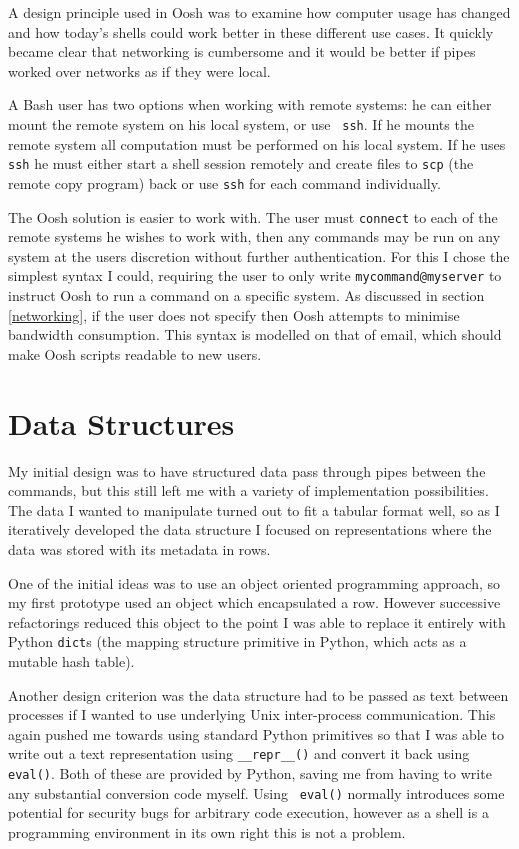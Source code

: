 \documentclass[12pt,twoside,notitlepage]{report}
\begin{document}
A design principle used in Oosh was to examine how computer usage has
changed and how today's shells could work better in these different
use cases. It quickly became clear that networking is cumbersome and
it would be better if pipes worked over networks as if they were
local.

A Bash user has two options when working with remote systems: he can
either mount the remote system on his local system, or use {\tt
  ssh}. If he mounts the remote system all computation must be
performed on his local system. If he uses {\tt ssh} he must either
start a shell session remotely and create files to {\tt scp} (the
remote copy program) back or use {\tt ssh} for each command
individually.

The Oosh solution is easier to work with. The user must {\tt connect}
to each of the remote systems he wishes to work with, then any
commands may be run on any system at the users discretion without
further authentication. For this I chose the simplest syntax I could,
requiring the user to only write {\tt mycommand@myserver} to instruct
Oosh to run a command on a specific system. As discussed in section
\ref{networking}, if the user does not specify then Oosh attempts to
minimise bandwidth consumption. This syntax is modelled on that of
email, which should make Oosh scripts readable to new users.

\section{Data Structures}
My initial design was to have structured data pass through pipes between the
commands, but this still left me with a variety of implementation
possibilities. The data I wanted to manipulate turned out to fit a tabular
format well, so as I iteratively developed the data structure I
focused on representations where the data was stored with its metadata
in rows.

One of the initial ideas was to use an object oriented programming
approach, so my first prototype used an object which encapsulated
a row. However successive refactorings reduced this object to the point
I was able to replace it entirely with Python {\tt dict}s (the mapping
structure primitive in Python, which acts as a mutable hash table).

Another design criterion was the data structure had to be passed as
text between processes if I wanted to use underlying Unix
inter-process communication. This again pushed me towards using
standard Python primitives so that I was able to write out a text
representation using {\tt \_\_repr\_\_()} and convert it back using
{\tt eval()}. Both of these are provided by Python, saving me from
having to write any substantial conversion code myself. Using {\tt
  eval()} normally introduces some potential for security bugs for arbitrary
code execution, however as a shell is a programming environment in its
own right this is not a problem.
\end{document}
